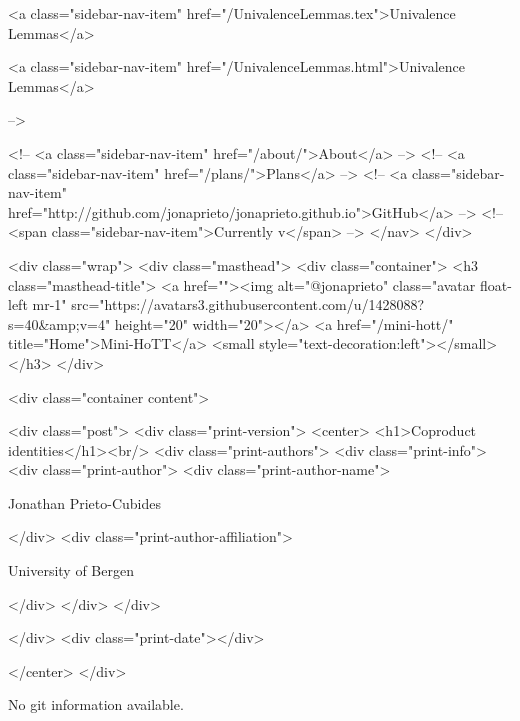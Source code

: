       
    
      
        
          <a class="sidebar-nav-item" href="/UnivalenceLemmas.tex">Univalence Lemmas</a>
        
      
    
      
        
          <a class="sidebar-nav-item" href="/UnivalenceLemmas.html">Univalence Lemmas</a>
        
      
     -->

    <!-- <a class="sidebar-nav-item" href="/about/">About</a> -->
    <!-- <a class="sidebar-nav-item" href="/plans/">Plans</a> -->
    <!-- <a class="sidebar-nav-item" href="http://github.com/jonaprieto/jonaprieto.github.io">GitHub</a> -->
    <!-- <span class="sidebar-nav-item">Currently v</span> -->
  </nav>
</div>

    <div class="wrap">
      <div class="masthead">
        <div class="container">
          <h3 class="masthead-title">
            <a href=""><img alt="@jonaprieto" class="avatar float-left mr-1" src="https://avatars3.githubusercontent.com/u/1428088?s=40&amp;v=4" height="20" width="20"></a>
            <a href="/mini-hott/" title="Home">Mini-HoTT</a>
            <small style="text-decoration:left"></small>
          </h3>
        </div>
      
      <div class="container content">
        







<div class="post">
  <div class="print-version">
    <center>
      <h1>Coproduct identities</h1><br/>
        <div class="print-authors">
          <div class="print-info">
            <div class="print-author">
              <div class="print-author-name">
                
                  Jonathan Prieto-Cubides
                
              </div>
              <div class="print-author-affiliation">
                
                  University of Bergen
                
                </div>
            </div>
          </div>
          
          
        </div>
        <div class="print-date"></div>
        
        
    </center>
  </div>

  
  No git information available.
  

